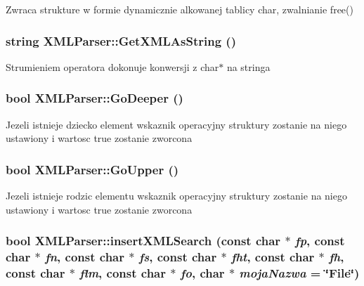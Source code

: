 Zwraca strukture w formie dynamicznie alkowanej tablicy char, zwalnianie free() 

\hypertarget{classXMLParser_af3a6c6210160027795f1261524f76ea3}{
\subsubsection[{GetXMLAsString}]{\setlength{\rightskip}{0pt plus 5cm}string XMLParser::GetXMLAsString ()}}
\label{classXMLParser_af3a6c6210160027795f1261524f76ea3}


Strumieniem operatora dokonuje konwersji z char$\ast$ na stringa 

\hypertarget{classXMLParser_aff335a6c46a39700c013d2996cde7c52}{
\subsubsection[{GoDeeper}]{\setlength{\rightskip}{0pt plus 5cm}bool XMLParser::GoDeeper ()}}
\label{classXMLParser_aff335a6c46a39700c013d2996cde7c52}


Jezeli istnieje dziecko element wskaznik operacyjny struktury zostanie na niego ustawiony i wartosc true zostanie zworcona 

\hypertarget{classXMLParser_a694016bf62d05c8834d189510f2189ed}{
\subsubsection[{GoUpper}]{\setlength{\rightskip}{0pt plus 5cm}bool XMLParser::GoUpper ()}}
\label{classXMLParser_a694016bf62d05c8834d189510f2189ed}


Jezeli istnieje rodzic elementu wskaznik operacyjny struktury zostanie na niego ustawiony i wartosc true zostanie zworcona 

\hypertarget{classXMLParser_ac5ac0a78d6f4db3d7361d7397e7ff925}{
\subsubsection[{insertXMLSearch}]{\setlength{\rightskip}{0pt plus 5cm}bool XMLParser::insertXMLSearch (const char $\ast$ {\em fp}, \/  const char $\ast$ {\em fn}, \/  const char $\ast$ {\em fs}, \/  const char $\ast$ {\em fht}, \/  const char $\ast$ {\em fh}, \/  const char $\ast$ {\em flm}, \/  const char $\ast$ {\em fo}, \/  char $\ast$ {\em mojaNazwa} = {\ttfamily \char`\"{}File\char`\"{}})}}
\label{classXMLParser_ac5ac0a78d6f4db3d7361d7397e7ff925}


